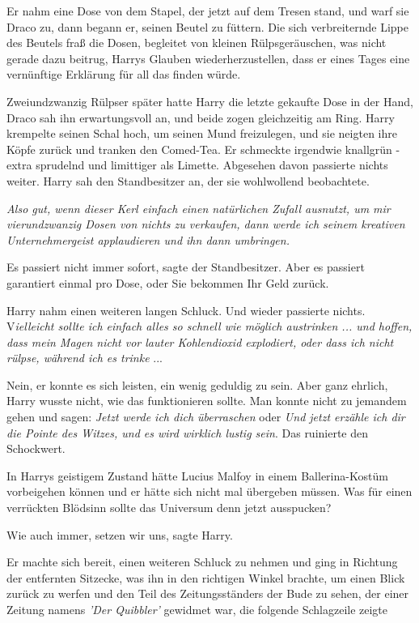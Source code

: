 Er nahm eine Dose von dem Stapel, der jetzt auf dem Tresen stand, und warf sie
Draco zu, dann begann er, seinen Beutel zu füttern. Die sich verbreiternde Lippe
des Beutels fraß die Dosen, begleitet von kleinen Rülpsgeräuschen, was nicht
gerade dazu beitrug, Harrys Glauben wiederherzustellen, dass er eines Tages eine
vernünftige Erklärung für all das finden würde.

Zweiundzwanzig Rülpser später hatte Harry die letzte gekaufte Dose in der Hand,
Draco sah ihn erwartungsvoll an, und beide zogen gleichzeitig am Ring. Harry
krempelte seinen Schal hoch, um seinen Mund freizulegen, und sie neigten ihre
Köpfe zurück und tranken den Comed-Tea. Er schmeckte irgendwie knallgrün - extra
sprudelnd und limittiger als Limette. Abgesehen davon passierte nichts weiter.
Harry sah den Standbesitzer an, der sie wohlwollend beobachtete.

\emph{Also gut, wenn dieser Kerl einfach einen natürlichen Zufall ausnutzt, um
mir vierundzwanzig Dosen von nichts zu verkaufen, dann werde ich seinem
kreativen Unternehmergeist applaudieren und ihn dann umbringen.}

\glqq{}Es passiert nicht immer sofort\grqq{}, sagte der Standbesitzer.
\glqq{}Aber es passiert garantiert einmal pro Dose, oder Sie bekommen Ihr Geld
zurück.\grqq{}

Harry nahm einen weiteren langen Schluck. Und wieder passierte nichts.
V\emph{ielleicht sollte ich einfach alles so schnell wie möglich austrinken ...
und hoffen, dass mein Magen nicht vor lauter Kohlendioxid explodiert, oder dass
ich nicht rülpse, während ich es trinke} ...

Nein, er konnte es sich leisten, ein wenig geduldig zu sein. Aber ganz ehrlich,
Harry wusste nicht, wie das funktionieren sollte. Man konnte nicht zu jemandem
gehen und sagen: \emph{\glqq{}Jetzt werde ich dich überraschen\grqq{}} oder
\emph{\glqq{}Und jetzt erzähle ich dir die Pointe des Witzes, und es wird
wirklich lustig sein\grqq{}}. Das ruinierte den Schockwert.

In Harrys geistigem Zustand hätte Lucius Malfoy in einem Ballerina-Kostüm
vorbeigehen können und er hätte sich nicht mal übergeben müssen. Was für einen
verrückten Blödsinn sollte das Universum denn jetzt ausspucken?

\glqq{}Wie auch immer, setzen wir uns\grqq{}, sagte Harry.

Er machte sich bereit, einen weiteren Schluck zu nehmen und ging in Richtung der
entfernten Sitzecke, was ihn in den richtigen Winkel brachte, um einen Blick
zurück zu werfen und den Teil des Zeitungsständers der Bude zu sehen, der einer
Zeitung namens \emph{'Der Quibbler'} gewidmet war, die folgende Schlagzeile
zeigte

